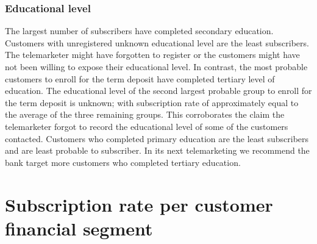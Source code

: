 \subsubsection*{Educational level}
The largest number of subscribers have completed secondary education. Customers with unregistered unknown educational level are the least subscribers. The telemarketer might have forgotten to register or the customers might have not been willing to expose their educational level. In contrast, the most probable customers to enroll for the term deposit have completed tertiary level of education. The educational level of the second largest probable group to enroll for the term deposit is unknown; with subscription rate of approximately equal to the average of the three remaining groups. This corroborates the claim the telemarketer forgot to record the educational level of some of the customers contacted. Customers who completed primary education are the least subscribers and are least probable to subscriber. In its next telemarketing we recommend the bank target more customers who completed tertiary education.

\section{Subscription rate per customer financial segment}

